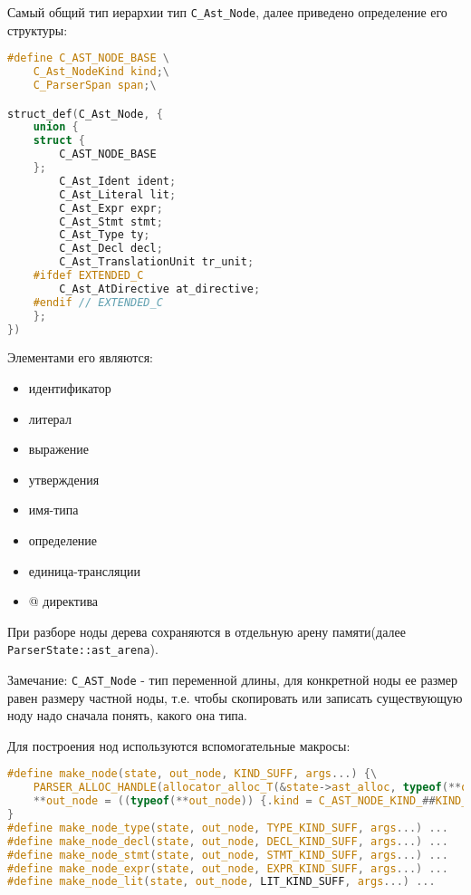 Самый общий тип иерархии тип \verb|C_Ast_Node|, далее приведено определение его структуры:


\begin{lstlisting}[language=c, caption={Структура элемента AST}, label={parsing:ast:node-struct}]
#define C_AST_NODE_BASE \
    C_Ast_NodeKind kind;\
    C_ParserSpan span;\

struct_def(C_Ast_Node, {
    union {
    struct {
        C_AST_NODE_BASE
    };
        C_Ast_Ident ident;
        C_Ast_Literal lit;
        C_Ast_Expr expr;
        C_Ast_Stmt stmt;
        C_Ast_Type ty;
        C_Ast_Decl decl;
        C_Ast_TranslationUnit tr_unit;
    #ifdef EXTENDED_C
        C_Ast_AtDirective at_directive;
    #endif // EXTENDED_C
    };
})
\end{lstlisting}

Элементами его являются:
\begin{itemize}
    \item идентификатор
    \item литерал
    \item выражение
    \item утверждения
    \item имя-типа
    \item определение
    \item единица-трансляции
    \item @ директива
\end{itemize}

При разборе ноды дерева сохраняются в отдельную арену памяти(далее \verb|ParserState::ast_arena|).

Замечание: \verb|C_AST_Node| - тип переменной длины, для конкретной ноды ее размер равен размеру частной ноды,
т.е. чтобы скопировать или записать существующую ноду надо сначала понять, какого она типа.

Для построения нод используются вспомогательные макросы:
\begin{lstlisting}[language=c]
#define make_node(state, out_node, KIND_SUFF, args...) {\
    PARSER_ALLOC_HANDLE(allocator_alloc_T(&state->ast_alloc, typeof(**out_node), out_node));\
    **out_node = ((typeof(**out_node)) {.kind = C_AST_NODE_KIND_##KIND_SUFF, ##args });\
}
#define make_node_type(state, out_node, TYPE_KIND_SUFF, args...) ...
#define make_node_decl(state, out_node, DECL_KIND_SUFF, args...) ...
#define make_node_stmt(state, out_node, STMT_KIND_SUFF, args...) ...
#define make_node_expr(state, out_node, EXPR_KIND_SUFF, args...) ...
#define make_node_lit(state, out_node, LIT_KIND_SUFF, args...) ...
\end{lstlisting}


